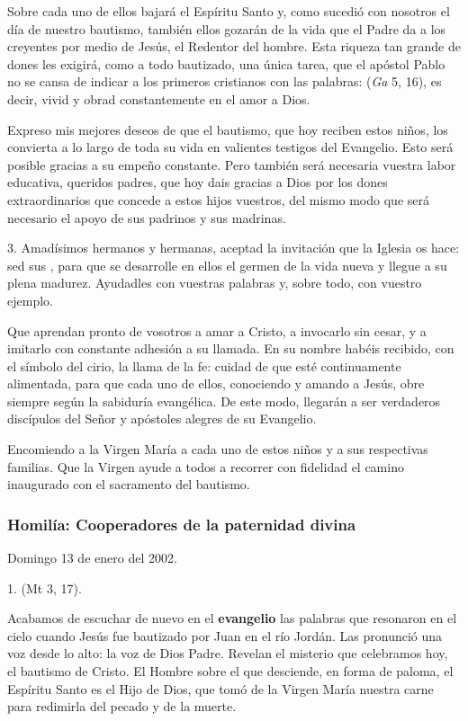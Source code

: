 {Sobre cada uno de ellos bajará el Espíritu Santo y, como sucedió con nosotros el día de nuestro bautismo, también ellos gozarán de la vida que el Padre da a los creyentes por medio de Jesús, el Redentor del hombre. Esta riqueza tan grande de dones les exigirá, como a todo bautizado, una única tarea, que el apóstol Pablo no se cansa de indicar a los primeros cristianos con las palabras:  (\emph{Ga} 5, 16), es decir, vivid y obrad constantemente en el amor a Dios.

Expreso mis mejores deseos de que el bautismo, que hoy reciben estos niños, los convierta a lo largo de toda su vida en valientes testigos del Evangelio. Esto será posible gracias a su empeño constante. Pero también será necesaria vuestra labor educativa, queridos padres, que hoy dais gracias a Dios por los dones extraordinarios que concede a estos hijos vuestros, del mismo modo que será necesario el apoyo de sus padrinos y sus madrinas.

3. Amadísimos hermanos y hermanas, aceptad la invitación que la Iglesia os hace: sed sus , para que se desarrolle en ellos el germen de la vida nueva y llegue a su plena madurez. Ayudadles con vuestras palabras y, sobre todo, con vuestro ejemplo.

Que aprendan pronto de vosotros a amar a Cristo, a invocarlo sin cesar, y a imitarlo con constante adhesión a su llamada. En su nombre habéis recibido, con el símbolo del cirio, la llama de la fe: cuidad de que esté continuamente alimentada, para que cada uno de ellos, conociendo y amando a Jesús, obre siempre según la sabiduría evangélica. De este modo, llegarán a ser verdaderos discípulos del Señor y apóstoles alegres de su Evangelio.

Encomiendo a la Virgen María a cada uno de estos niños y a sus respectivas familias. Que la Virgen ayude a todos a recorrer con fidelidad el camino inaugurado con el sacramento del bautismo.

\subsubsection{Homilía: Cooperadores de la paternidad divina}

Domingo 13 de enero del 2002.

1.  (Mt 3, 17).

Acabamos de escuchar de nuevo en el \textbf{evangelio} las palabras que resonaron en el cielo cuando Jesús fue bautizado por Juan en el río Jordán. Las pronunció una voz desde lo alto: la voz de Dios Padre. Revelan el misterio que celebramos hoy, el bautismo de Cristo. El Hombre sobre el que desciende, en forma de paloma, el Espíritu Santo es el Hijo de Dios, que tomó de la Virgen María nuestra carne para redimirla del pecado y de la muerte.

}
